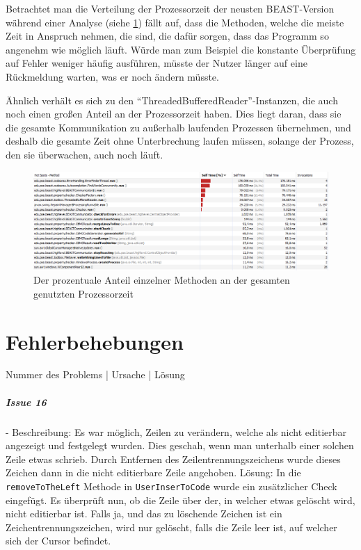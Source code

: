 \documentclass[a4paper]{scrreprt}
\begin{document}
\newpage
Betrachtet man die Verteilung der Prozessorzeit der neusten BEAST-Version während einer
Analyse (siehe \ref{fig5}) fällt auf, dass die Methoden, welche die meiste
Zeit in Anspruch nehmen, die sind, die dafür sorgen, dass das Programm
so angenehm wie möglich läuft. Würde man zum Beispiel die konstante
Überprüfung auf Fehler weniger häufig ausführen, müsste der Nutzer länger auf eine
Rückmeldung warten, was er noch ändern müsste. 

Ähnlich verhält es sich zu den
"`ThreadedBufferedReader"'-Instanzen, die auch noch einen großen Anteil an der
Prozessorzeit haben. Dies liegt daran, dass sie die gesamte Kommunikation zu
außerhalb laufenden Prozessen übernehmen, und deshalb die gesamte Zeit ohne
Unterbrechung laufen müssen, solange der Prozess, den sie überwachen, auch noch
läuft.

\begin{figure}[ht]
	\centering
  \includegraphics[width=1.0\textwidth,
  height=0.40\textwidth]{images/BEAST_PROCESSORTIME.png} \caption{Der
  prozentuale Anteil einzelner Methoden an der gesamten genutzten Prozessorzeit}
	\label{fig5}
\end{figure}

\chapter{Fehlerbehebungen}

Nummer des Problems | Ursache | Lösung

\paragraph{Issue 16}- \newline
Beschreibung: Es war möglich, Zeilen zu verändern, welche als nicht editierbar angezeigt und festgelegt wurden. Dies geschah, wenn man unterhalb einer solchen Zeile etwas schrieb. Durch Entfernen des Zeilentrennungszeichens wurde dieses Zeichen dann in die nicht editierbare Zeile angehoben.
\newline
Lösung: In die \verb!removeToTheLeft! Methode in \verb!UserInserToCode! wurde ein zusätzlicher Check eingefügt. Es überprüft nun, ob die Zeile über der, in welcher etwas gelöscht wird, nicht editierbar ist. Falls ja, und das zu löschende Zeichen ist ein Zeichentrennungszeichen, wird nur gelöscht, falls die Zeile leer ist, auf welcher sich der Cursor befindet.
\end{document}
